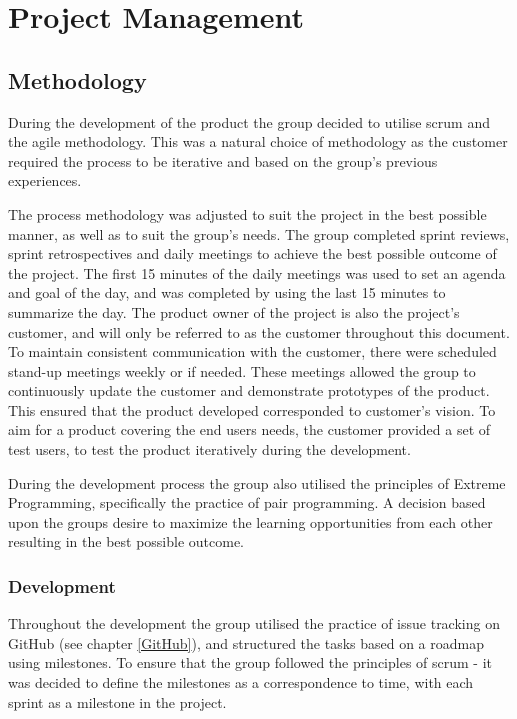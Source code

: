 
\chapter{Project Management}

\section{Methodology}
\label{methodology}
During the development of the product the group decided to utilise scrum and the agile methodology. This was a natural choice of methodology as the customer required the process to be iterative and based on the group's previous experiences.

The process methodology was adjusted to suit the project in the best possible manner, as well as to suit the group's needs. The group completed sprint reviews, sprint retrospectives and daily meetings to achieve the best possible outcome of the project. The first 15 minutes of the daily meetings was used to set an agenda and goal of the day, and was completed by using the last 15 minutes to summarize the day. The product owner of the project is also the project's customer, and will only be referred to as the customer throughout this document. To maintain consistent communication with the customer, there were scheduled stand-up meetings weekly or if needed. These meetings allowed the group to continuously update the customer and demonstrate prototypes of the product. This ensured that the product developed corresponded to customer's vision. To aim for a product covering the end users needs, the customer provided a set of test users, to test the product iteratively during the development.

During the development process the group also utilised the principles of Extreme Programming, specifically the practice of pair programming. A decision based upon the groups desire to maximize the learning opportunities from each other resulting in the best possible outcome. 

\subsection{Development}
Throughout the development the group utilised the practice of issue tracking on GitHub (see chapter  \ref{GitHub}), and structured the tasks based on a roadmap using milestones. To ensure that the group followed the principles of scrum - it was decided to define the milestones as a correspondence to time, with each sprint as a milestone in the project.

